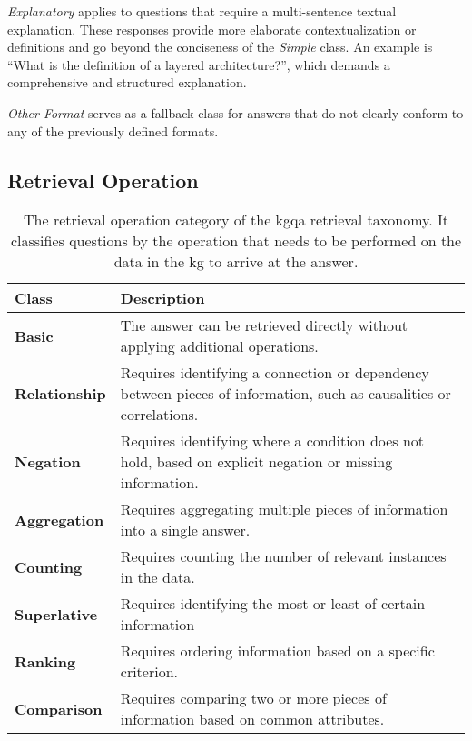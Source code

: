 \emph{Explanatory} applies to questions that require a multi-sentence textual explanation. These responses provide more elaborate contextualization or definitions and go beyond the conciseness of the \emph{Simple} class. An example is \enquote{What is the definition of a layered architecture?}, which demands a comprehensive and structured explanation.

\emph{Other Format} serves as a fallback class for answers that do not clearly conform to any of the previously defined formats.


\subsection{Retrieval Operation}


\begin{table}[t]
    \centering
    \begin{tabular}{@{}lp{8cm}@{}}
        \toprule
        \textbf{Class} & \textbf{Description} \\
        \midrule
        \textbf{Basic}
            & The answer can be retrieved directly without applying additional operations. \\
        \cmidrule(l){1-2}
            \textbf{Relationship}
            & Requires identifying a connection or dependency between pieces of information, such as causalities or correlations. \\
        \cmidrule(l){1-2}
            \textbf{Negation}
            & Requires identifying where a condition does not hold, based on explicit negation or missing information.  \\
        \cmidrule(l){1-2}
            \textbf{Aggregation}
            & Requires aggregating multiple pieces of information into a single answer. \\
        \cmidrule(l){1-2}
            \textbf{Counting}
            & Requires counting the number of relevant instances in the data. \\
        \cmidrule(l){1-2}
            \textbf{Superlative}
            & Requires identifying the most or least of certain information \\
        \cmidrule(l){1-2}
            \textbf{Ranking}
            & Requires ordering information based on a specific criterion. \\
        \cmidrule(l){1-2}
            \textbf{Comparison}
            & Requires comparing two or more pieces of information based on common attributes. \\
        \bottomrule
    \end{tabular}
    \caption[Retrieval Operation Category of the Taxonomy]{The retrieval operation category of the \gls{kgqa} retrieval taxonomy. It classifies questions by the operation that needs to be performed on the data in the \gls{kg} to arrive at the answer.}
    \label{tab:retrieval_operation}
\end{table}

